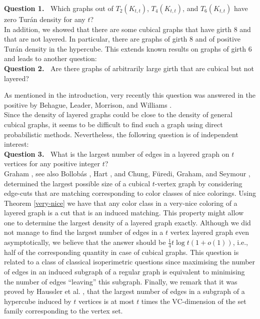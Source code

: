 \documentclass[11pt, a4paper]{article}
\begin{document}
{\bf Question 1.~} Which graphs  out of $T_2(K_{t,t})$, $T_4(K_{t,t})$, and $T_6(K_{t,t})$ have zero Tur\'an density for any $t$?\\

In addition, we showed that there are some cubical graphs that have girth $8$ and that are not layered. In particular, there are graphs of girth $8$ and of positive Tur\'an density in the hypercube.
This extends known results on graphs of girth $6$ and leads to another question:\\

{\bf Question 2.~} Are there graphs of arbitrarily large girth that are cubical but not layered?

As mentioned in the introduction, very recently this question was answered in the positive by Behague, Leader,  Morrison,  and Williams \cite{BLMW}.\\



Since the density of layered graphs could be close to the density of general cubical graphs, it  seems to be difficult  to find such a graph using direct  probabilistic methods. Nevertheless, the following question is of independent interest:\\



{\bf Question 3.~} What is the largest number of edges in a layered graph on $t$ vertices  for any positive integer $t$? \\


Graham \cite{G}, see also Bollob\'as \cite{Bo}, Hart \cite{H1}, and Chung, F\"uredi, Graham, and Seymour  \cite{CFGS},  determined the largest possible size of a cubical $t$-vertex graph by considering edge-cuts that are matching corresponding to color classes of nice colorings.   
Using Theorem \ref{very-nice} we have that any color class in a very-nice coloring of a layered graph is a cut that is an induced matching. This property might allow one to determine the largest density of a layered graph exactly. 
Although we did not manage to find the largest number of edges in a $t$ vertex layered graph even asymptotically, we believe that the answer should be $\frac{1}{4} t \log t (1+o(1))$, i.e., 
half of the corresponding quantity in case of cubical graphs. 
This question is related  to a class of classical isoperimetric questions since maximising the number of edges in an induced subgraph of a regular graph is equivalent to minimising the number of edges ``leaving'' this subgraph. Finally, we remark that it was proved by Haussler et al. \cite{Ha1, Ha2}, that the largest number of edges in a subgraph of a hypercube induced by $t$ vertices is at most $t$ times the VC-dimension of the set family corresponding to the vertex set.  \\
\end{document}
